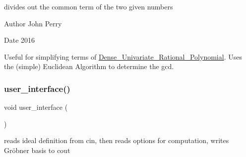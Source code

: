 divides out the common term of the two given numbers 

\begin{DoxyAuthor}{Author}
John Perry 
\end{DoxyAuthor}
\begin{DoxyDate}{Date}
2016
\end{DoxyDate}
Useful for simplifying terms of \hyperlink{group__polygroup_class_dense___univariate___rational___polynomial}{Dense\+\_\+\+Univariate\+\_\+\+Rational\+\_\+\+Polynomial}. Uses the (simple) Euclidean Algorithm to determine the gcd. \mbox{\label{group__utils_ga72d205e8226d578b892515edc527cc83}} 
\subsubsection{\texorpdfstring{user\+\_\+interface()}{user\_interface()}}
{\footnotesize\ttfamily void user\+\_\+interface (\begin{DoxyParamCaption}{ }\end{DoxyParamCaption})}



reads ideal definition from {\ttfamily cin}, then reads options for computation, writes Gr\"{o}bner basis to {\ttfamily cout} 

